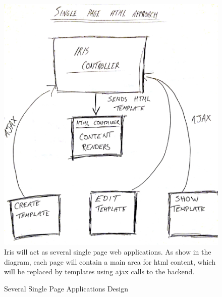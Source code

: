 \documentclass[12pt,a4paper,titlepage]{report}
\begin{document}
\begin{figure}[H]
\begin{tcolorbox}
\includegraphics[width=\textwidth,height=\textheight,keepaspectratio]{single_html_container}
Iris will act as several single page web applications. As show in the diagram, each page will contain a main area for html content, which will be replaced by templates using ajax calls to the backend.
\end{tcolorbox}
\caption{Several Single Page Applications Design}
\end{figure}

\nocite{*}
\printbibliography
\end{document}
